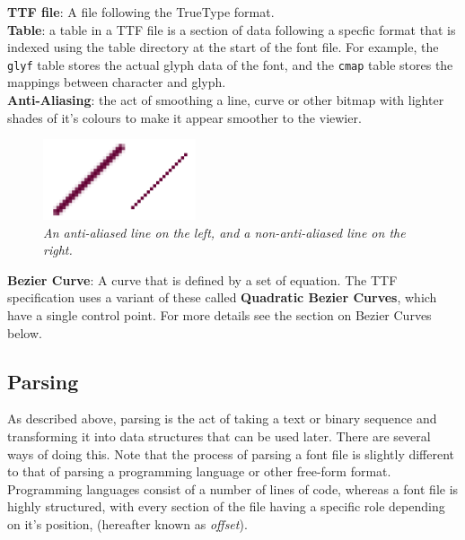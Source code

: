 \documentclass{report}
\begin{document}
\textbf{TTF file}: A file following the TrueType format.
\\

\textbf{Table}: a table in a TTF file is a section of data following a specfic
format that is indexed using the table directory at the start of the font file.
For example, the \texttt{glyf} table stores the actual glyph data of the font,
and the \texttt{cmap} table stores the mappings between character and glyph.
\\

\textbf{Anti-Aliasing}: the act of smoothing a line, curve or other bitmap with
lighter shades of it's colours to make it appear smoother to the viewier.

\begin{figure}[h]
  \centering
  \includegraphics[width=0.4\textwidth]{aa}
  \caption{\textit{An anti-aliased line on the left, and a non-anti-aliased line
    on the right.}}
\end{figure}

\textbf{Bezier Curve}: A curve that is defined by a set of equation. The TTF
specification uses a variant of these called \textbf{Quadratic Bezier Curves},
which have a single control point. For more details see the section on Bezier
Curves below.
\\

\textbf{}

\subsection{Parsing}
As described above, parsing is the act of taking a text or binary sequence and
transforming it into data structures that can be used later. There are several
ways of doing this. Note that the process of parsing a font file is slightly
different to that of parsing a programming language or other free-form format.
Programming languages consist of a number of lines of code, whereas a font file
is highly structured, with every section of the file having a specific role
depending on it's position, (hereafter known as \textit{offset}).
\end{document}

